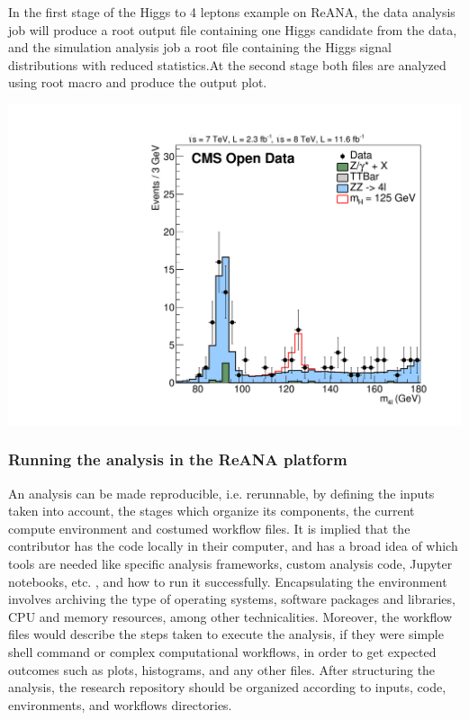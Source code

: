 \documentclass[letter]{article}
\newcommand\tab[1][1cm]{\hspace*{#1}}
\begin{document}
In the first stage of the Higgs to 4 leptons example on ReANA, the data analysis job will produce a root output file containing one Higgs candidate from the data, and the simulation analysis job a root file containing the Higgs signal distributions with reduced statistics.At the second stage both files are analyzed using root macro and produce the output plot.
\begin{center}
\hspace{-80pt}
\includegraphics[scale=0.075]{plot}
\vspace{-10pt}
\end{center}

\subsubsection{Running the analysis in the ReANA platform}
\tab An analysis can be made reproducible, i.e. rerunnable, by defining the inputs taken into account, the stages which organize its components, the current compute environment and costumed workflow files. It is implied that the contributor has the code locally in their computer, and has a broad idea of which tools are needed like specific analysis frameworks, custom analysis code, Jupyter notebooks, etc. , and how to run it successfully. Encapsulating the environment involves archiving the type of operating systems, software packages and libraries, CPU and memory resources, among other technicalities. Moreover, the workflow files would describe the steps taken to execute the analysis, if they were simple shell command or complex computational workflows, in order to get expected outcomes such as plots, histograms, and any other files. After structuring the analysis, the research repository should be organized according to inputs, code, environments, and workflows directories. 
\end{document}
